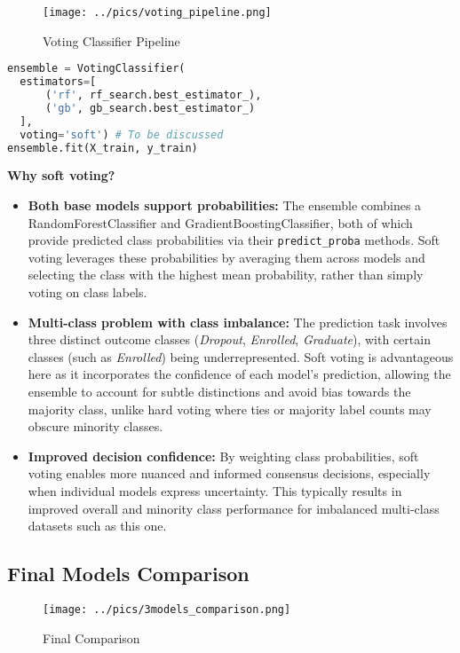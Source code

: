 \documentclass[twoside,final]{hcmut-report}
\begin{document}
\begin{minipage}{0.4\textwidth}
  \begin{figure}[H]
    \centering
    \caption{Voting Classifier Pipeline}
    \texttt{[image: ../pics/voting\_pipeline.png]}
    \label{pipe_vote}
  \end{figure}
\end{minipage}
\hfill
\begin{minipage}{0.5\textwidth}
  \begin{lstlisting}[language=python]
ensemble = VotingClassifier(
  estimators=[
      ('rf', rf_search.best_estimator_),
      ('gb', gb_search.best_estimator_)
  ],
  voting='soft') # To be discussed
ensemble.fit(X_train, y_train)
  \end{lstlisting}
\end{minipage}

\textbf{Why soft voting?}
\begin{itemize}
  \item \textbf{Both base models support probabilities:} The ensemble combines a RandomForestClassifier and GradientBoostingClassifier, both of which provide predicted class probabilities via their \texttt{predict\_proba} methods. Soft voting leverages these probabilities by averaging them across models and selecting the class with the highest mean probability, rather than simply voting on class labels.
  \item \textbf{Multi-class problem with class imbalance:} The prediction task involves three distinct outcome classes (\emph{Dropout}, \emph{Enrolled}, \emph{Graduate}), with certain classes (such as \emph{Enrolled}) being underrepresented. Soft voting is advantageous here as it incorporates the confidence of each model's prediction, allowing the ensemble to account for subtle distinctions and avoid bias towards the majority class, unlike hard voting where ties or majority label counts may obscure minority classes.
  \item \textbf{Improved decision confidence:} By weighting class probabilities, soft voting enables more nuanced and informed consensus decisions, especially when individual models express uncertainty. This typically results in improved overall and minority class performance for imbalanced multi-class datasets such as this one.
\end{itemize}

\subsection{Final Models Comparison}
\begin{figure}[H]
  \centering
  \texttt{[image: ../pics/3models\_comparison.png]}
  \caption{Final Comparison}
  \label{final_comp}
\end{figure}
\end{document}
